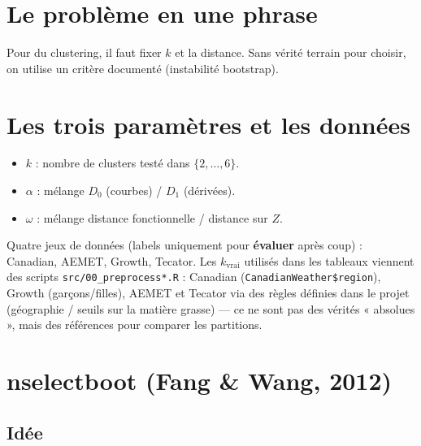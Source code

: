 \documentclass[11pt, a4paper]{article}
\begin{document}
\section{Le problème en une phrase}

Pour du clustering, il faut fixer $k$ et la distance. Sans vérité terrain pour
choisir, on utilise un critère documenté (instabilité bootstrap).

\section{Les trois paramètres et les données}

\begin{itemize}
  \item \textbf{$k$} : nombre de clusters testé dans $\{2,\ldots,6\}$.
  \item \textbf{$\alpha$} : mélange $D_0$ (courbes) / $D_1$ (dérivées).
  \item \textbf{$\omega$} : mélange distance fonctionnelle / distance sur $Z$.
\end{itemize}

Quatre jeux de données (labels uniquement pour \textbf{évaluer} après coup) :
Canadian, AEMET, Growth, Tecator. Les $k_{\mathrm{vrai}}$ utilisés dans les
tableaux viennent des scripts \texttt{src/00\_preprocess*.R} : Canadian
(\texttt{CanadianWeather\$region}), Growth (garçons/filles), AEMET et Tecator
via des règles définies dans le projet (géographie / seuils sur la matière grasse)
--- ce ne sont pas des vérités « absolues », mais des références pour comparer les
partitions.

\section{nselectboot (Fang \& Wang, 2012)}

\subsection{Idée}
\end{document}
